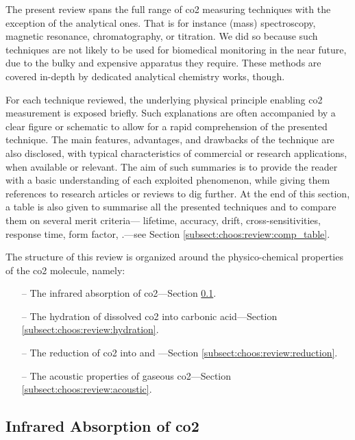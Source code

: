 The present review spans the full range of \gls{co2} measuring techniques with the exception of the analytical ones. That is for instance (mass) spectroscopy, magnetic resonance, chromatography, or titration. We did so because such techniques are not likely to be used for biomedical monitoring in the near future, due to the bulky and expensive apparatus they require. These methods are covered in-depth by dedicated analytical chemistry works, though\cite{skoog2013, harvey2016}.

For each technique reviewed, the underlying physical principle enabling \gls{co2} measurement is exposed briefly. Such explanations are often accompanied by a clear figure or schematic to allow for a rapid comprehension of the presented technique. The main features, advantages, and drawbacks of the technique are also disclosed, with typical characteristics of commercial or research applications, when available or relevant. The aim of such summaries is to provide the reader with a basic understanding of each exploited phenomenon, while giving them references to research articles or reviews to dig further. At the end of this section, a table is also given to summarise all the presented techniques and to compare them on several merit criteria---\eg{} lifetime, accuracy, drift, cross-sensitivities, response time, form factor, \etc{}.---see Section \ref{subsect:choos:review:comp_table}.

The structure of this review is organized around the physico-chemical properties of the \gls{co2} molecule, namely:
\begin{enumerate}
	\item[--] The infrared absorption of \gls{co2}---Section \ref{subsect:choos:ir_abs}.
	\item[--] The hydration of dissolved \gls{co2} into carbonic acid---Section \ref{subsect:choos:review:hydration}.
	\item[--] The reduction of \gls{co2} into  and ---Section \ref{subsect:choos:review:reduction}.
	\item[--] The acoustic properties of gaseous \gls{co2}---Section \ref{subsect:choos:review:acoustic}.
\end{enumerate}

\subsection{Infrared Absorption of \texorpdfstring{\gls{co2}}{CO2}}\label{subsect:choos:ir_abs}

